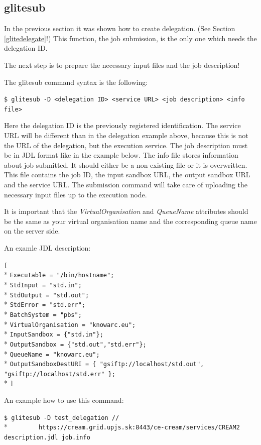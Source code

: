 \documentclass{article}
\begin{document}
\subsection{glitesub}
\label{glitesub}
In the previous section it was shown how to create delegation. (See Section \ref{glitedelegate}!) This function, the job submission, is the only one which needs the delegation ID.\par The next step is to prepare the necessary input files and the job description!\par
The glitesub command syntax is the following:
\begin{shaded}\verb#$ glitesub -D <delegation ID> <service URL> <job description> <info file>#\end{shaded}
Here the delegation ID is the previously registered identification. The service URL will be different than in the delegation example above, because this is not the URL of the delegation, but the execution service. The job description must be in JDL format like in the example below. The info file stores information about job submitted. It should either be a non-existing file or it is overwritten. This file contains the job ID, the input sandbox URL, the output sandbox URL and the service URL. The submission command will take care of uploading the necessary input files up to the execution node.\par
It is important that the \textit{VirtualOrganisation} and \textit{QueueName} attributes should be the same as your virtual organisation name and the corresponding queue name on the server side.\par

An examle JDL description:
\begin{framed}
\verb#[#\\*
\verb#Executable = "/bin/hostname";#\\*
\verb#StdInput = "std.in";#\\*
\verb#StdOutput = "std.out";#\\*
\verb#StdError = "std.err";#\\*
\verb#BatchSystem = "pbs";#\\*
\verb#VirtualOrganisation = "knowarc.eu";#\\*
\verb#InputSandbox = {"std.in"};#\\*
\verb#OutputSandbox = {"std.out","std.err"};#\\*
\verb#QueueName = "knowarc.eu";#\\*
\verb#OutputSandboxDestURI = { "gsiftp://localhost/std.out", "gsiftp://localhost/std.err" };#\\*
\verb#]#
\end{framed}
An example how to use this command:
\begin{shaded}\verb#$ glitesub -D test_delegation //#\\*
\verb#        https://cream.grid.upjs.sk:8443/ce-cream/services/CREAM2 description.jdl job.info#\end{shaded}
\end{document}
